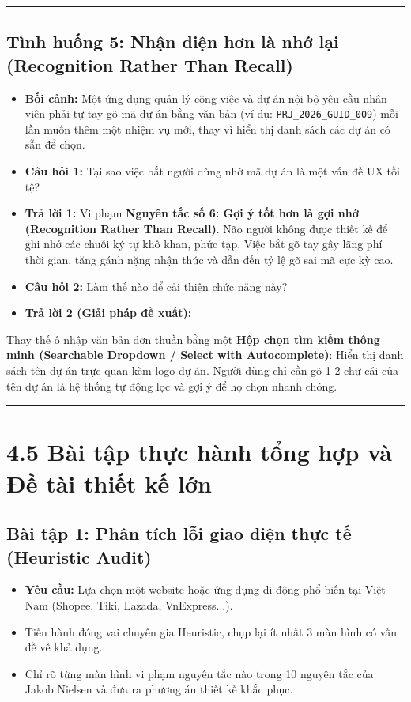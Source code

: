 \documentclass[11pt,a4paper,oneside]{report}
\begin{document}
\bigskip\hrule\bigskip

\subsection{Tình huống 5: Nhận diện hơn là nhớ lại (Recognition Rather Than Recall)}
\begin{itemize}[leftmargin=1.5em]
\item \textbf{Bối cảnh:} Một ứng dụng quản lý công việc và dự án nội bộ yêu cầu nhân viên phải tự tay gõ mã dự án bằng văn bản (ví dụ: \texttt{PRJ\_2026\_GUID\_009}) mỗi lần muốn thêm một nhiệm vụ mới, thay vì hiển thị danh sách các dự án có sẵn để chọn.
\item \textbf{Câu hỏi 1:} Tại sao việc bắt người dùng nhớ mã dự án là một vấn đề UX tồi tệ?
\item \textbf{Trả lời 1:} Vi phạm \textbf{Nguyên tắc số 6: Gợi ý tốt hơn là gợi nhớ (Recognition Rather Than Recall)}. Não người không được thiết kế để ghi nhớ các chuỗi ký tự khô khan, phức tạp. Việc bắt gõ tay gây lãng phí thời gian, tăng gánh nặng nhận thức và dẫn đến tỷ lệ gõ sai mã cực kỳ cao.
\item \textbf{Câu hỏi 2:} Làm thế nào để cải thiện chức năng này?
\item \textbf{Trả lời 2 (Giải pháp đề xuất):}  
\end{itemize}
Thay thế ô nhập văn bản đơn thuần bằng một \textbf{Hộp chọn tìm kiếm thông minh (Searchable Dropdown / Select with Autocomplete)}: Hiển thị danh sách tên dự án trực quan kèm logo dự án. Người dùng chỉ cần gõ 1-2 chữ cái của tên dự án là hệ thống tự động lọc và gợi ý để họ chọn nhanh chóng.


\bigskip\hrule\bigskip

\section{4.5 Bài tập thực hành tổng hợp và Đề tài thiết kế lớn}

\subsection{Bài tập 1: Phân tích lỗi giao diện thực tế (Heuristic Audit)}
\begin{itemize}[leftmargin=1.5em]
\item \textbf{Yêu cầu:} Lựa chọn một website hoặc ứng dụng di động phổ biến tại Việt Nam (Shopee, Tiki, Lazada, VnExpress...).
\item Tiến hành đóng vai chuyên gia Heuristic, chụp lại ít nhất 3 màn hình có vấn đề về khả dụng.
\item Chỉ rõ từng màn hình vi phạm nguyên tắc nào trong 10 nguyên tắc của Jakob Nielsen và đưa ra phương án thiết kế khắc phục.
\end{itemize}
\end{document}
